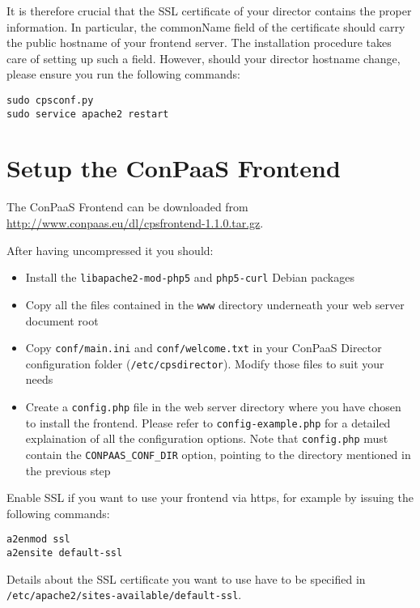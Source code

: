 \documentclass[10pt]{article}
\begin{document}
It is therefore crucial that the SSL certificate of your director contains the
proper information. In particular, the commonName field of the certificate
should carry the public hostname of your frontend server. The installation
procedure takes care of setting up such a field. However, should your director
hostname change, please ensure you run the following commands:

\begin{verbatim}
sudo cpsconf.py
sudo service apache2 restart
\end{verbatim}

\section{Setup the ConPaaS Frontend}
\label{sec:frontend}

The ConPaaS Frontend can be downloaded from
\url{http://www.conpaas.eu/dl/cpsfrontend-1.1.0.tar.gz}.

After having uncompressed it you should:

\begin{itemize}
\item Install the \texttt{libapache2-mod-php5} and \texttt{php5-curl} Debian packages
\item Copy all the files contained in the \texttt{www} directory underneath your web server document root
\item Copy \texttt{conf/main.ini} and \texttt{conf/welcome.txt} in your ConPaaS
  Director configuration folder (\texttt{/etc/cpsdirector}). Modify those files to suit
  your needs
\item Create a \texttt{config.php} file in the web server directory where you have chosen to install the
  frontend. Please refer to \texttt{config-example.php} for a detailed explaination of
  all the configuration options. Note that \texttt{config.php} must contain the
  \texttt{CONPAAS\_CONF\_DIR} option, pointing to the directory mentioned in the previous
  step
\end{itemize}

Enable SSL if you want to use your frontend via https, for example by issuing
the following commands:

\begin{verbatim}
a2enmod ssl
a2ensite default-ssl
\end{verbatim}

Details about the SSL certificate you want to use have to be specified in
\texttt{/etc/apache2/sites-available/default-ssl}.
\end{document}
